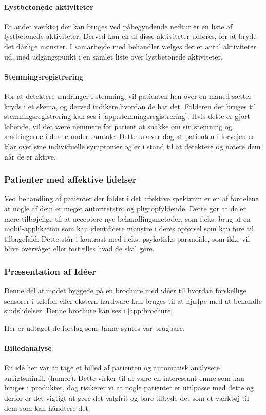 \paragraph{Lystbetonede aktiviteter}
Et andet værktøj der kan bruges ved påbegyndende nedtur er en liste af lystbetonede aktiviteter.
Derved kan en af disse aktiviteter udføres, for at bryde det dårlige mønster.
I samarbejde med behandler vælges der et antal aktiviteter ud, med udgangspunkt i en samlet liste over lystbetonede aktiviteter.

\paragraph{Stemningsregistrering}
For at detektere ændringer i stemning, vil patienten hen over en måned sætter kryds i et skema, og derved indikere hvordan de har det.
Folderen der bruges til stemningsregistrering kan ses i \cref{app:stemningsregistrering}.
Hvis dette er gjort løbende, vil det være nemmere for patient at snakke om sin stemning og ændringerne i denne under samtale.
Dette kræver dog at patienten i forvejen er klar over sine individuelle symptomer og er i stand til at detektere og notere dem når de er aktive.

\subsubsection{Patienter med affektive lidelser}
Ved behandling af patienter der falder i det affektive spektrum er en af fordelene at nogle af dem er meget autoritetstro og pligtopfyldende.
Dette gør at de er mere tilbøjelige til at acceptere nye behandlingsmetoder, som f.eks. brug af en mobil-applikation som kan identificere mønstre i deres opførsel som kan føre til tilbagefald.
Dette står i kontrast med f.eks. psykotiske paranoide, som ikke vil blive overvåget eller fortælles hvad de skal gøre.

\subsubsection{Præsentation af Idéer}\label{janne_ideer}
Denne del af mødet byggede på en brochure med idéer til hvordan forskellige sensorer i telefon eller ekstern hardware kan bruges til at hjælpe med at behandle sindslidelser. 
Denne brochure kan ses i \cref{app:brochure}.

Her er udtaget de forslag som Janne syntes var brugbare.

\paragraph{Billedanalyse}
En idé her var at tage et billed af patienten og automatisk analysere ansigtsmimik (humør).
Dette virker til at være en interessant emne som kan bruges i produktet, dog risikerer vi at nogle patienter er utilpasse med dette og derfor er det vigtigt at gøre det valgfrit og bare tilbyde det som et værktøj til dem som kan håndtere det.

